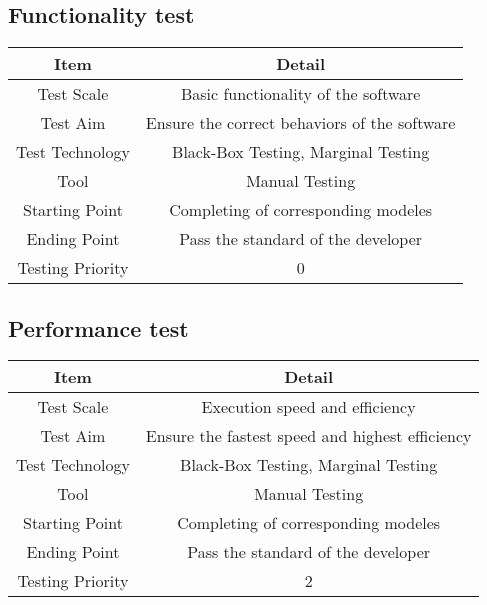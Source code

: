 \documentclass{article}
\begin{document}
	\subsection{Functionality test}
	\begin{center}
			\begin{tabular}{cc}
			\toprule
			Item & Detail \\
			\midrule
			Test Scale & Basic functionality of the software\\
			Test Aim & Ensure the correct behaviors of the software\\
			Test Technology & Black-Box Testing, Marginal Testing\\
			Tool & Manual Testing\\
			Starting Point & Completing of corresponding modeles\\
			Ending Point & Pass the standard of the developer\\
			Testing Priority & 0 \\
			\bottomrule
			\end{tabular}
			\end{center}
	\subsection{Performance test}
	\begin{center}
			\begin{tabular}{cc}
			\toprule
			Item & Detail \\
			\midrule
			Test Scale & Execution speed and efficiency\\
			Test Aim & Ensure the fastest speed and highest efficiency\\
			Test Technology & Black-Box Testing, Marginal Testing\\
			Tool & Manual Testing\\
			Starting Point & Completing of corresponding modeles\\
			Ending Point & Pass the standard of the developer\\
			Testing Priority & 2 \\
			\bottomrule
			\end{tabular}
			\end{center}
\end{document}
